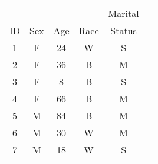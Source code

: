 \begin{tabular}{cccccc}
   &     &     &      & Marital \\
ID & Sex & Age & Race & Status \\
\hline
1  & F  & 24  & W   & S  \\
2  & F  & 36  & B & M  \\
3  & F  & 8  & B & S  \\
4  & F  & 66  & B & M  \\
5  & M  & 84  & B & M  \\
6  & M  & 30  & W & M  \\
7  & M  & 18  & W & S  \\
\hline
\end{tabular}
